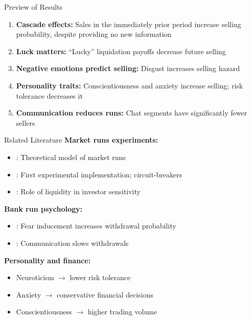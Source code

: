 \documentclass{beamer}
\begin{document}
\begin{frame}{Preview of Results}
\begin{enumerate}
    \item \textbf{Cascade effects:} Sales in the immediately prior period increase selling probability, despite providing no new information
    \item \textbf{Luck matters:} ``Lucky'' liquidation payoffs decrease future selling
    \item \textbf{Negative emotions predict selling:} Disgust increases selling hazard
    \item \textbf{Personality traits:} Conscientiousness and anxiety increase selling; risk tolerance decreases it
    \item \textbf{Communication reduces runs:} Chat segments have significantly fewer sellers
\end{enumerate}
\end{frame}


\begin{frame}{Related Literature}
\textbf{Market runs experiments:}
\begin{itemize}
    \item \cite{bernardo2004liquidity}: Theoretical model of market runs
    \item \cite{magnani2020dynamic}: First experimental implementation; circuit-breakers
    \item \cite{choi2022market}: Role of liquidity in investor sensitivity
\end{itemize}
\vspace{0.3cm}
\textbf{Bank run psychology:}
\begin{itemize}
    \item \cite{dijk2017bank}: Fear inducement increases withdrawal probability
    \item \cite{shakina2018coordination}: Communication slows withdrawals
\end{itemize}
\vspace{0.3cm}
\textbf{Personality and finance:}
\begin{itemize}
    \item Neuroticism $\rightarrow$ lower risk tolerance \citep{rustichini2016toward}
    \item Anxiety $\rightarrow$ conservative financial decisions \citep{gambetti2012effect}
    \item Conscientiousness $\rightarrow$ higher trading volume \citep{bajo2023psychological}
\end{itemize}
\end{frame}
\end{document}
